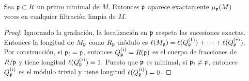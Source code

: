 \begin{proposition}
Sea $\mathfrak p \subset R$ un primo minimal de $M$. Entonces $\mathfrak p$ aparece exactamente $\mu_\mathfrak p(M)$ veces en cualquier filtración limpia de $M$.
\end{proposition}

\begin{proof}
Ignorando la gradación, la localización en $\mathfrak p$ respeta las sucesiones exactas. Entonces la longitud de $M_\mathfrak p$ como $R_\mathfrak p$-módulo es $\ell(M_\mathfrak p) = \ell(Q_\mathfrak p^{(1)}) + \dots + \ell(Q_\mathfrak p^{(r)})$. Por construcción, si $\mathfrak p_i = \mathfrak p$, entonces $Q_\mathfrak p^{(i)} = R(\mathfrak p)$ es el cuerpo de fracciones de $R/\mathfrak p$ y tiene longitud $\ell(Q_\mathfrak p^{(i)}) = 1$. Puesto que $\mathfrak p$ es minimal, si $\mathfrak p_i \ne \mathfrak p$, entonces $Q_\mathfrak p^{(i)}$ es el módulo trivial y tiene longitud $\ell(Q_\mathfrak p^{(i)}) = 0$.
\end{proof}
